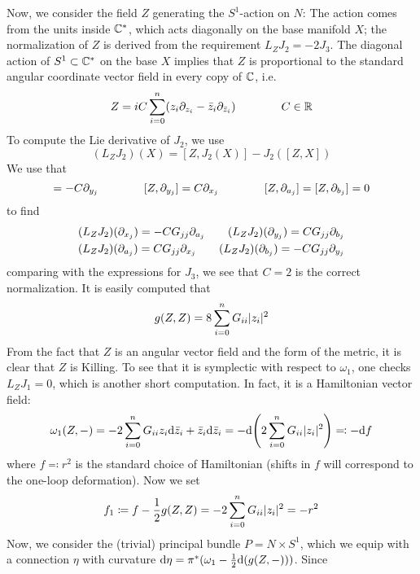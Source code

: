 \documentclass[parskip=half]{scrartcl}
\begin{document}
Now, we consider the field $Z$ generating the $S^1$-action on $N$: The action comes from the units inside $\mathbb{C}^*$, which acts diagonally on the base manifold $X$; the normalization of $Z$ is derived from the requirement $L_Z J_2=-2J_3$. The diagonal action of $S^1\subset \mathbb{C}^*$ on the base $X$ implies that $Z$ is proportional to the standard angular coordinate vector field in every copy of $\mathbb{C}$, i.e.
\begin{equation*}
	Z= iC\sum_{i=0}^n (z_i \partial_{z_i}-\bar z_i \partial_{\bar z_i}) \qquad \qquad C\in \mathbb{R}
\end{equation*}
To compute the Lie derivative of $J_2$, we use
\begin{equation*}
	(L_ZJ_2)(X)=[Z,J_2(X)]-J_2([Z,X])
\end{equation*}
We use that
\begin{equation*}
	[Z,\p_{x_j}]=-C\p_{y_j} \qquad \qquad [Z,\p_{y_j}]=C\p_{x_j} \qquad \qquad [Z,\p_{a_j}]=[Z,\p_{b_j}]=0
\end{equation*}
to find
\begin{gather*}
	(L_ZJ_2)(\partial_{x_j})=-CG_{jj}\partial_{a_j} \qquad 
	(L_ZJ_2)(\partial_{y_j})=CG_{jj}\partial_{b_j} \\
	(L_ZJ_2)(\partial_{a_j})=CG_{jj}\partial_{x_j} \qquad
	(L_ZJ_2)(\partial_{b_j})=-CG_{jj}\partial_{y_j}
\end{gather*}
comparing with the expressions for $J_3$, we see that $C=2$ is the correct normalization. It is easily computed that
\begin{equation*}
	g(Z,Z)=8\sum_{i=0}^n G_{ii}\lvert z_i \rvert^2
\end{equation*}
From the fact that $Z$ is an angular vector field and the form of the metric, it is clear that $Z$ is Killing. To see that it is symplectic with respect to $\omega_1$, one checks $L_ZJ_1=0$, which is another short computation. In fact, it is a Hamiltonian vector field:
\begin{equation*}
	\omega_1(Z,-)=-2\sum_{i=0}^n G_{ii}z_i \mathrm{d} \bar z_i+\bar z_i \mathrm{d} \bar z_i
	=-\mathrm{d}\Bigg(2\sum_{i=0}^n G_{ii} \lvert z_i \rvert^2\Bigg)\eqqcolon -\mathrm{d} f
\end{equation*}
where $f\eqqcolon r^2$ is the standard choice of Hamiltonian (shifts in $f$ will correspond to the one-loop deformation). Now we set
\begin{equation*}
	f_1\coloneqq f-\frac{1}{2}g(Z,Z)=-2\sum_{i=0}^n G_{ii} \lvert z_i \rvert^2=-r^2
\end{equation*}
Now, we consider the (trivial) principal bundle $P=N\times S^1$, which we equip with a connection $\eta$ with curvature $\mathrm{d}\eta=\pi^*(\omega_1-\frac{1}{2}\mathrm{d} (g(Z,-)))$. Since
\end{document}

